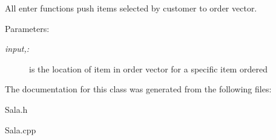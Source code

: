All enter functions push items selected by customer to order vector. 

\begin{Desc}
\item[Parameters:]
\begin{description}
\item[{\em input,:}]is the location of item in order vector for a specific item ordered \end{description}
\end{Desc}


The documentation for this class was generated from the following files:\begin{CompactItemize}
\item 
Sala.h\item 
Sala.cpp\end{CompactItemize}
